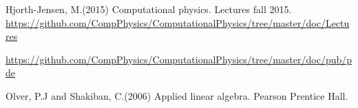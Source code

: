\documentclass{article}
\begin{document}
\begin{thebibliography}{9}
	Hjorth-Jensen, M.(2015)
	Computational physics. Lectures fall 2015. 
	\url{https://github.com/CompPhysics/ComputationalPhysics/tree/master/doc/Lectures}
	
	\url{https://github.com/CompPhysics/ComputationalPhysics/tree/master/doc/pub/pde}
	
	Olver, P.J and Shakiban, C.(2006)
	Applied linear algebra. Pearson Prentice Hall. 

\end{thebibliography}
\end{document}

